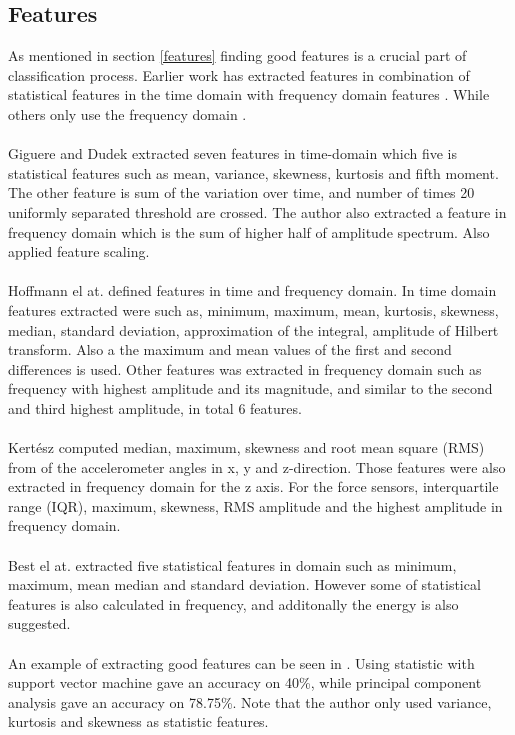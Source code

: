 \documentclass[USenglish]{ifimaster}  %
\begin{document}
\subsection{Features}
As mentioned in section \ref{features} finding good features is a crucial part of classification process. Earlier work has extracted features in combination of statistical features in the time domain with frequency domain features \cite{5152662} \cite{Giguere2009} \cite{5509309}. While others only use the frequency domain \cite{4543710} \cite{5979766}.
\\
\\
Giguere and Dudek \cite{5152662} extracted seven features in time-domain which five is statistical features such as mean, variance, skewness, kurtosis and fifth moment. The other feature is sum of the variation over time, and number of times 20 uniformly separated threshold are crossed. The author also extracted a feature in frequency domain which is the sum of higher half of amplitude spectrum. Also applied feature scaling.
\\
\\
Hoffmann el at. \cite{Hoffmann20141790} defined features in time and frequency domain. In time domain features extracted were such as, minimum, maximum, mean, kurtosis, skewness, median, standard deviation, approximation of the integral, amplitude of Hilbert transform. Also a the maximum and mean values of the first and second differences is used. Other features was extracted in frequency domain such as frequency with highest amplitude and its magnitude, and similar to the second and third highest amplitude, in total 6 features. 
\\
\\
Kertész \cite{7387710} computed median, maximum, skewness and root mean square (RMS) from of the accelerometer angles in x, y and z-direction. Those features were also extracted in frequency domain for the z axis. For the force sensors, interquartile range (IQR), maximum, skewness, RMS amplitude and the highest amplitude in frequency domain.  
\\
\\
Best el at.\cite{26b23e912c654fe4b7478fd910130195} extracted five statistical features in domain such as minimum, maximum, mean median and standard deviation. However some of statistical features is also calculated in frequency, and additonally the energy is also suggested.
\\
\\
An example of extracting good features can be seen in \cite{5602459}. Using statistic with support vector machine gave an accuracy on 40\%, while principal component analysis gave an accuracy on 78.75\%. Note that the author only used variance, kurtosis and skewness as statistic features. 
\end{document}
